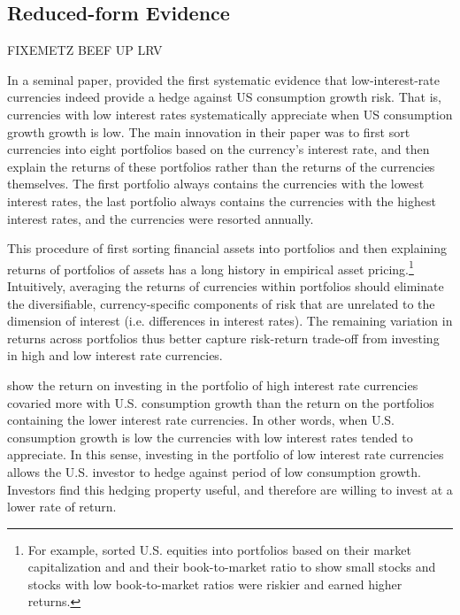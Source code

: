 \documentclass{ar-1col}
\begin{document}
\subsection{Reduced-form Evidence}

FIXEMETZ BEEF UP LRV

In a seminal paper, \citet{LustigVerdelhan2007} provided  the first systematic evidence 
that low-interest-rate currencies indeed provide a hedge against US consumption growth risk. That is, currencies with low interest rates systematically appreciate when US consumption growth growth is low. 
The main innovation in their paper was to first sort currencies into eight 
portfolios based on the currency's interest rate, and then explain the returns 
of these portfolios rather than the returns of the currencies themselves. The 
first portfolio always contains the currencies with the lowest interest rates, 
the last portfolio always contains the currencies with the highest interest 
rates, and the currencies were resorted annually.

This procedure of first sorting financial assets into portfolios and then
explaining returns of portfolios of assets has a long history in empirical 
asset pricing.\footnote{For example, \citet{FamaFrench1992} sorted 
U.S. equities into portfolios based on their market capitalization and 
and their book-to-market ratio to show small stocks and stocks with low
book-to-market ratios were riskier and earned higher returns.} Intuitively, 
averaging the returns of currencies within portfolios should eliminate the
diversifiable, currency-specific components of risk that are unrelated
to the dimension of interest (i.e. differences in interest rates). The 
remaining variation in returns across portfolios thus better capture 
risk-return trade-off from investing in high and low interest rate 
currencies.

\citet{LustigVerdelhan2007} show the return on investing in the portfolio 
of high interest rate currencies covaried more with U.S. consumption growth 
than the return on the portfolios containing the lower interest rate currencies. 
In other words, when U.S. consumption growth is low the currencies with low 
interest rates tended to appreciate. In this sense, investing in the portfolio 
of low interest rate currencies allows the U.S. investor to hedge against period 
of low consumption growth. Investors find this hedging property useful, and 
therefore are willing to invest at a lower rate of return. 
\end{document}
